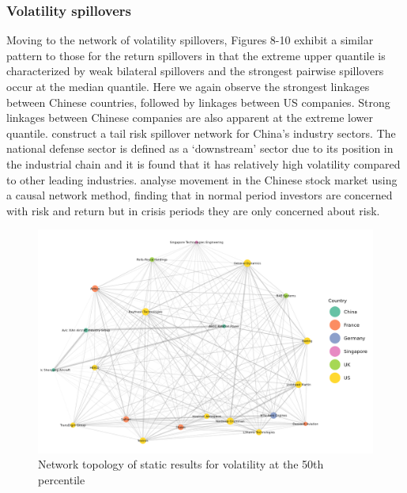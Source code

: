 \documentclass[
  number]{elsarticle}
\begin{document}
\hypertarget{volatility-spillovers}{%
\subsubsection{Volatility spillovers}\label{volatility-spillovers}}

Moving to the network of volatility spillovers, Figures 8-10 exhibit a
similar pattern to those for the return spillovers in that the extreme
upper quantile is characterized by weak bilateral spillovers and the
strongest pairwise spillovers occur at the median quantile. Here we
again observe the strongest linkages between Chinese countries, followed
by linkages between US companies. Strong linkages between Chinese
companies are also apparent at the extreme lower quantile.
\citep{huang2021} construct a tail risk spillover network for China's
industry sectors. The national defense sector is defined as a
`downstream' sector due to its position in the industrial chain and it
is found that it has relatively high volatility compared to other
leading industries. \citep{bu2019} analyse movement in the Chinese stock
market using a causal network method, finding that in normal period
investors are concerned with risk and return but in crisis periods they
are only concerned about risk.

\begin{figure}[H]

{\centering \includegraphics[width=6.75in,height=\textheight]{plots/fig-vol50.png}

}

\caption{\label{fig-vol50}Network topology of static results for
volatility at the 50th percentile}

\end{figure}
\end{document}
